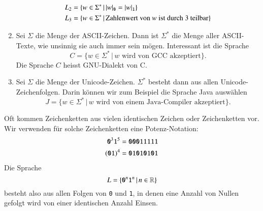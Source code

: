 \begin{enumerate}
\begin{align*}
L_2&=\{ w\in\Sigma^*\,|\, |w|_{\tt 0}=|w|_{\tt 1}\}\\
L_3&=\{ w\in\Sigma^*\,|\, \text{Zahlenwert von $w$ ist durch 3 teilbar}\}
\end{align*}
\item Sei $\Sigma$ die Menge der ASCII-Zeichen.
Dann ist $\Sigma^*$ die Menge aller ASCII-Texte, wie unsinnig sie auch
immer sein mögen.
Interessant ist die Sprache
\[
C=\{w\in\Sigma^*\,|\,\text{$w$ wird von GCC akzeptiert}\}.
\]
Die Sprache $C$ heisst GNU-Dialekt von C.
\item Sei $\Sigma$ die Menge der Unicode-Zeichen.
$\Sigma^*$ besteht dann aus allen Unicode-Zeichenfolgen.
Darin können wir zum Beispiel die
Sprache Java auswählen
\[
J
=\{w\in\Sigma^*\,|\, {\text{$w$ wird von einem Java-Compiler akzeptiert}}\}.
\]
\end{enumerate}

Oft kommen Zeichenketten aus vielen identischen Zeichen oder Zeichenketten vor.
Wir verwenden für solche Zeichenketten eine Potenz-Notation:
\begin{align*}
{\tt 0}^3{\tt 1}^5&={\tt 00011111}\\
({\tt 01})^4&={\tt 01010101}
\end{align*}
Die Sprache
\[
L=\{ {\tt 0}^n{\tt 1}^n\,|\,n\in\mathbb R\}
\]
besteht also aus allen Folgen von {\tt 0} und {\tt 1}, in denen eine Anzahl
von Nullen gefolgt wird von einer identischen Anzahl Einsen.
